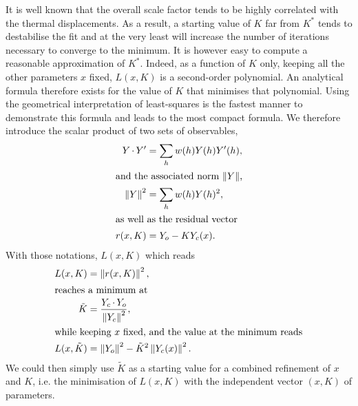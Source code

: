 \documentclass[pdf]{iucr}
\newcommand{\norm}[1]{\left\| #1 \right\|}
\DeclareMathOperator{\dotprod}{\cdot}
\begin{document}
It is well known that the overall scale factor tends to be highly correlated with the thermal displacements. As a result, a starting value of $K$ far from $K^*$ tends to destabilise the fit and at the very least will increase the number of iterations necessary to converge to the minimum. It is however easy to compute a reasonable approximation of $K^*$. Indeed, as a function of $K$ only, keeping all the other parameters $x$ fixed, $L(x, K)$ is a second-order polynomial. An analytical formula therefore exists for the value of $K$ that minimises that polynomial. Using the geometrical interpretation of least-squares is the fastest manner to demonstrate this formula and leads to the most compact formula. We therefore introduce the scalar product of two sets of observables,
\begin{align}
Y \dotprod Y' &= \sum_h w(h) Y(h) Y'(h), \\
\shortintertext{and the associated norm $\norm{Y}$,}
\norm{Y}^2 &= \sum_h w(h) Y(h)^2, \\
\shortintertext{as well as the residual vector}
r(x, K) &= Y_o - K Y_c(x).
\label{eqn:lsresidualdef}
\end{align}
With those notations, $L(x, K)$ which reads
\begin{align}
L(x, K) &= \norm{r(x, K)}^2, \\
\shortintertext{reaches a minimum at}
\tilde{K} &= \frac{Y_c \dotprod Y_o}{\norm{Y_c}^2},
\label{eqn:tildeK}
\\
\shortintertext{while keeping $x$ fixed, and the value at the minimum reads}
L(x, \tilde{K}) &= \norm{Y_o}^2 - \tilde{K}^2 \norm{Y_c(x)}^2.
\end{align}
We could then simply use $\tilde{K}$ as a starting value for a combined refinement of $x$ and $K$, i.e. the minimisation of $L(x, K)$ with the independent vector $(x, K)$ of parameters.
\end{document}
